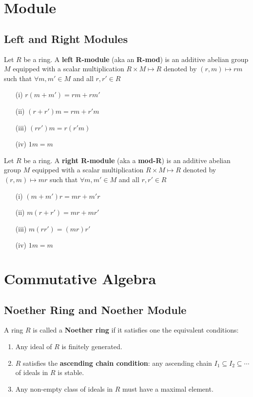 \documentclass[12pt]{book}
\begin{document}
\chapter{Module}

\section{Left and Right Modules}

\begin{definition}
	Let $R$ be a ring. A {\bf left R-module} (aka an {\bf R-mod}) is an additive abelian group $M$ equipped with a scalar multiplication $R\times M\mapsto R$ denoted by $(r,m)\mapsto rm$ such that $\forall m,m'\in M$ and all $r,r'\in R$
	
	\begin{enumerate}
		\item [(i)] $r(m+m')=rm+rm'$
		\item [(ii)] $(r+r')m=rm+r'm$
		\item [(iii)] $(rr')m=r(r'm)$
		\item [(iv)] $1m=m$
	\end{enumerate}
\end{definition}

\begin{definition}
	Let $R$ be a ring. A {\bf right R-module} (aka a {\bf mod-R}) is an additive abelian group $M$ equipped with a scalar multiplication $R\times M\mapsto R$ denoted by $(r,m)\mapsto mr$ such that $\forall m,m'\in M$ and all $r,r'\in R$
	
	\begin{enumerate}
		\item [(i)] $(m+m')r=mr+m'r$
		\item [(ii)] $m(r+r')=mr+mr'$
		\item [(iii)] $m(rr')=(mr)r'$
		\item [(iv)] $1m=m$
	\end{enumerate}
\end{definition}
	
\chapter{Commutative Algebra}
	
\section{Noether Ring and Noether Module}
	
	\begin{definition}
		A ring $R$ is called a {\bf Noether ring} if it satisfies one the equivalent conditions:
		\begin{enumerate}
			\item Any ideal of $R$ is finitely generated.
			\item $R$ satisfies the {\bf ascending chain condition}: any ascending chain $I_1\subseteq I_2\subseteq \cdots$ of ideals in $R$ is stable.
			\item Any non-empty class of ideals in $R$ must have a maximal element.
		\end{enumerate}
	\end{definition}
	
\end{document}
